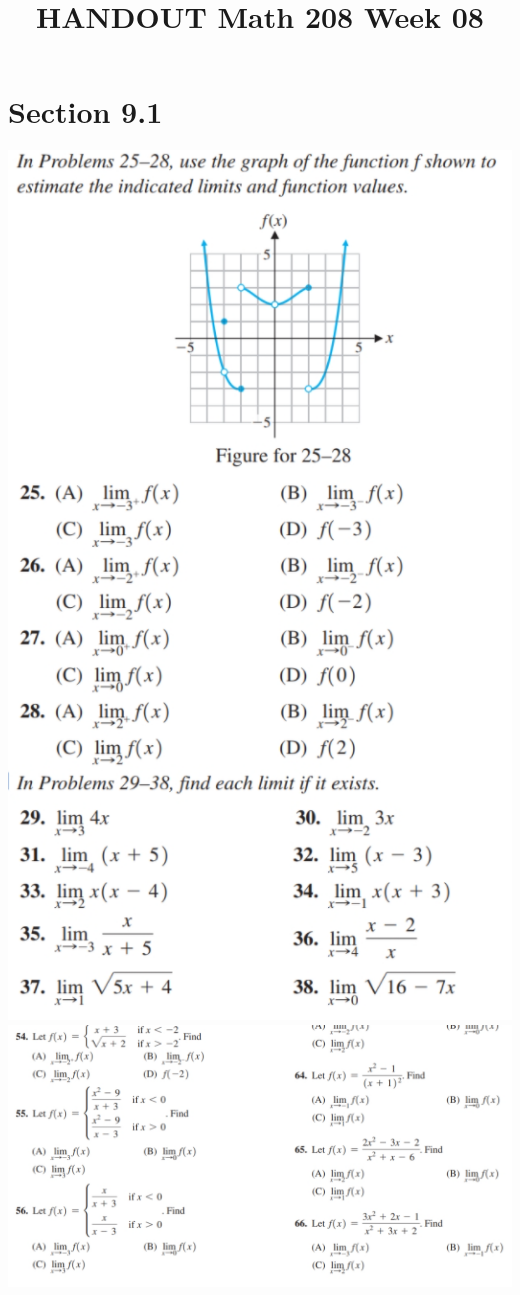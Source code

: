\documentclass[14pt]{extarticle}
\title{\vspace{-5ex}HANDOUT Math 208 Week 08}
\date{\vspace{-10ex}}
\begin{document}
\maketitle		

\section{Section 9.1}
\begin{center}
	\includegraphics[width=0.7\linewidth]{9-1-7} \\
	\includegraphics[width=1.0\linewidth]{9-1-8} \\
\end{center}
\end{document}
